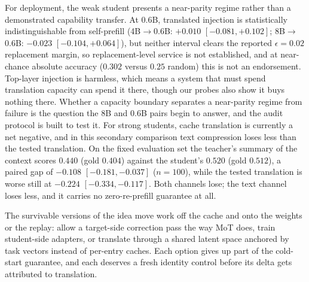\documentclass{article} %
\begin{document}
For deployment, the weak student presents a near-parity regime rather than a
demonstrated capability transfer. At 0.6B, translated injection is
statistically indistinguishable from self-prefill
(4B$\to$0.6B: $+0.010$ $[-0.081,+0.102]$; 8B$\to$0.6B: $-0.023$
$[-0.104,+0.064]$), but neither interval clears the reported $\epsilon{=}0.02$ replacement margin, so replacement-level service is not established, and
at near-chance absolute accuracy ($0.302$ versus $0.25$ random) this is not an
endorsement. Top-layer injection is harmless, which means a system that
must spend translation capacity can spend it there, though our probes also
show it buys nothing there. Whether a capacity boundary separates a
near-parity regime from failure is the question the 8B
and 0.6B pairs begin to answer, and the audit protocol is built to test it.
For strong students, cache translation is currently a net negative, and in this
secondary comparison text compression loses less than the tested translation.
On the fixed evaluation set the teacher's summary of the context scores $0.440$
(gold $0.404$) against the student's $0.520$ (gold $0.512$), a paired gap of
$-0.108$ $[-0.181, -0.037]$ ($n{=}100$), while the tested translation is worse
still at $-0.224$ $[-0.334, -0.117]$. Both channels lose; the text channel loses
less, and it carries no zero-re-prefill guarantee at all.

The survivable versions of the idea move work off the cache and onto the
weights or the replay: allow a target-side correction pass the way MoT does,
train student-side adapters, or translate through a shared latent space
anchored by task vectors instead of per-entry caches. Each option gives up
part of the cold-start guarantee, and each deserves a fresh identity control
before its delta gets attributed to translation.
\end{document}
